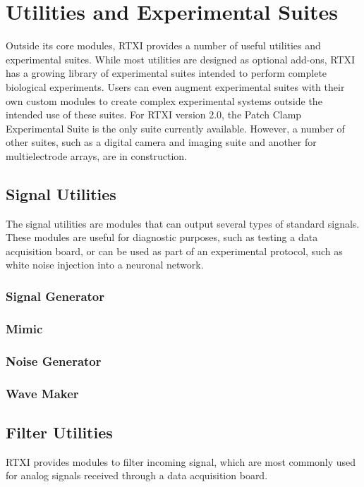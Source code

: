 \clearpage
\chapter{Utilities and Experimental Suites}
Outside its core modules, RTXI provides a number of useful utilities and experimental suites. While most utilities are designed as optional add-ons, RTXI has a growing library of experimental suites intended to perform complete biological experiments. Users can even augment experimental suites with their own custom modules to create complex experimental systems outside the intended use of these suites. For RTXI version 2.0, the Patch Clamp Experimental Suite is the only suite currently available. However, a number of other suites, such as a digital camera and imaging suite and another for multielectrode arrays, are in construction.

\clearpage
\section{Signal Utilities}
The signal utilities are modules that can output several types of standard signals. These modules are useful for diagnostic purposes, such as testing a data acquisition board, or can be used as part of an experimental protocol, such as white noise injection into a neuronal network.

\subsection{Signal Generator}


\subsection{Mimic}


\subsection{Noise Generator}


\subsection{Wave Maker}


\clearpage
\section{Filter Utilities}
RTXI provides modules to filter incoming signal, which are most commonly used for analog signals received through a data acquisition board. 

